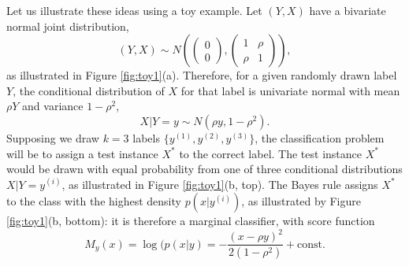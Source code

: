\documentclass[twoside,11pt]{article}
\begin{document}
Let us illustrate these ideas using a toy example.  Let $(Y, X)$ have
a bivariate normal joint distribution,
\[
(Y, X) \sim N\left(\begin{pmatrix}0 \\0\end{pmatrix}, \begin{pmatrix}1 & \rho \\ \rho & 1\end{pmatrix}\right),
\]
as illustrated in Figure \ref{fig:toy1}(a).  Therefore, for a given
randomly drawn label $Y$, the conditional
distribution of $X$ for that label is univariate normal with mean $\rho Y$ and variance $1-\rho^2$,
\[
X|Y = y \sim N(\rho y, 1-\rho^2).
\]
Supposing we draw $k = 3$ labels $\{y^{(1)},y^{(2)}, y^{(3)}\}$, the classification
problem will be to assign a test instance $X^*$ to the correct label.
The test instance $X^*$ would be drawn with equal probability from one
of three conditional distributions $ X | Y=y^{(i)}$, as illustrated in
Figure \ref{fig:toy1}(b, top).  The Bayes rule assigns $X^*$ to the
class with the highest density $p(x|y^{(i)})$, as illustrated by Figure
\ref{fig:toy1}(b, bottom): it is therefore a marginal classifier, with
score function
\[
M_y(x) = \log(p(x|y) = -\frac{(x - \rho y)^2}{2(1-\rho^2)}  + \text{const.}
\] %

\end{document}
